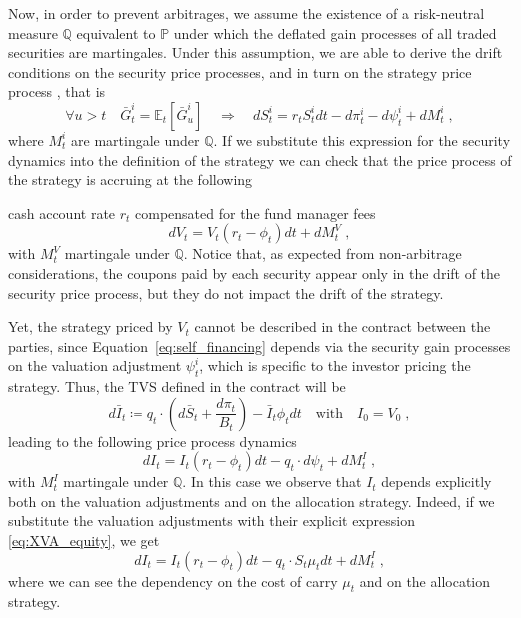 \documentclass[runningheads]{m2ef}
\newcommand\soutpars[1]{\let\helpcmd\sout\parhelp#1\par\relax\relax}
\newcommand{\change}[1]{{\color{red} {#1}}}%
\newcommand{\remove}[1]{{\color{red} \soutpars{{#1}}}}%
\begin{document}
Now, in order to prevent arbitrages, we assume the existence of a risk-neutral measure $\mathbb{Q}$ equivalent to $\mathbb{P}$ under which the deflated gain processes of all traded securities are martingales. Under this assumption, we are able to derive the drift conditions on the security price processes, and in turn on the strategy price process\change{, that is}
\begin{equation}
    \forall u >t \quad \bar{G}_t^i = \mathbb{E}_t \left[\bar{G}_u^i\right] \quad\Longrightarrow \quad dS_t^i = r_tS_t^idt-d\pi_t^i-d\psi_t^i + dM_t^i \; ,
\label{eq:risk_neutral}\end{equation}
where $M_t^i$ are martingale under $\mathbb{Q}$. If we substitute this expression for the security dynamics into the definition of the strategy we can check that the price process of the strategy is accruing at \change{the following} \remove{a} cash account rate $r_t$ compensated for the fund manager fees
\begin{equation}
    dV_t = V_t(r_t-\phi_t)dt + dM_t^V \; ,
\end{equation}
with $M_t^V$ martingale under $\mathbb{Q}$. Notice that, as expected from non-arbitrage considerations, the coupons paid by each security appear only in the drift of the security price process, but they do not impact the drift of the strategy. 

Yet, the strategy priced by $V_t$ cannot be described in the contract between the parties, since Equation~\eqref{eq:self_financing} depends via the security gain processes on the valuation adjustment $\psi_t^i$, which is specific to the investor pricing the strategy. Thus, the TVS defined in the contract will be
\begin{equation}
    d\bar{I}_t \coloneqq q_t \cdot \left(d\bar{S}_t + \frac{d\pi_t}{B_t} \right) - \bar{I}_t\phi_t dt \quad \text{with} \quad I_0 = V_0 \; , 
\label{eq:TVS_first}\end{equation}
leading to the following price process dynamics
\begin{equation}
    dI_t = I_t(r_t-\phi_t)dt -q_t\cdot d\psi_t +dM_t^I \; ,
\end{equation}
with $M_t^I$ martingale under $\mathbb{Q}$. In this case we observe that $I_t$ depends explicitly both on the valuation adjustments and on the allocation strategy. Indeed, if we substitute the valuation adjustments with their explicit expression \eqref{eq:XVA_equity}, we get
\begin{equation}
    dI_t = I_t(r_t-\phi_t)dt - q_t \cdot S_t \mu_t dt + dM_t^I \; ,
\end{equation}
where we can see the dependency on the cost of carry $\mu_t$ and on the allocation strategy.
\end{document}
